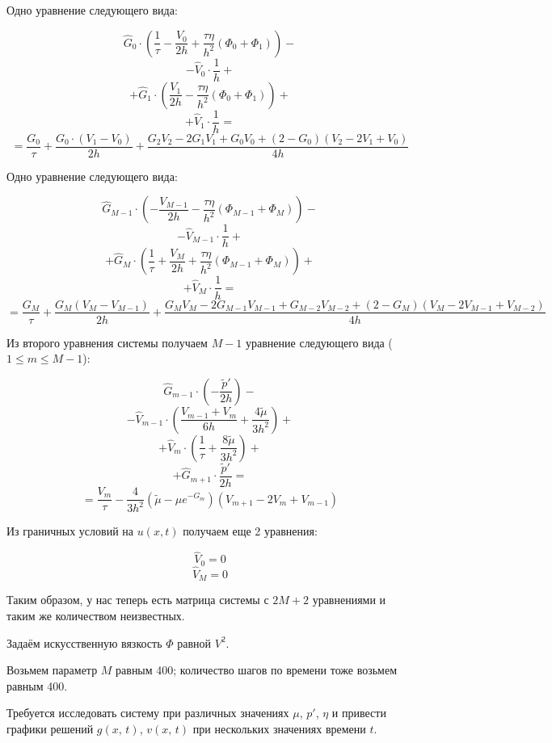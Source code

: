 \documentclass[12pt]{article}
\begin{document}
Одно уравнение следующего вида:

$$
  \hat{G}_0 \cdot \left( \frac{1}{\tau} - \frac{V_0}{2h} + \frac{\tau\eta}{h^2}\left(\Phi_{0} + \Phi_{1}\right)\right)
-
$$
$$
- \hat{V}_0 \cdot \frac{1}{h}
+
$$
$$
+ \hat{G}_1 \cdot \left(\frac{V_1}{2h} - \frac{\tau\eta}{h^2}\left(\Phi_{0} + \Phi_{1}\right)\right)
+
$$
$$
+ \hat{V}_1 \cdot \frac{1}{h} 
= 
$$
$$ 
= \frac{G_0}{\tau} +
  \frac{G_0 \cdot \left( V_1 - V_0 \right)}{2h} +
  \frac{G_2 V_2 - 2 G_1 V_1 + G_0 V_0 +
      \left( 2 - G_0 \right) \left( V_2 - 2 V_1 + V_0 \right)}{4h}
$$

Одно уравнение следующего вида:

$$
\hat{G}_{M-1} \cdot \left(-\frac{V_{M-1}}{2h} - \frac{\tau\eta}{h^2}\left(\Phi_{M-1} + \Phi_{M}\right)\right)
-
$$
$$
- \hat{V}_{M-1} \cdot \frac{1}{h}
+
$$
$$
+ \hat{G}_{M}   \cdot \left( \frac{1}{\tau} + \frac{V_M}{2h} + \frac{\tau\eta}{h^2}\left(\Phi_{M-1} + \Phi_{M}\right)\right)
+
$$
$$
+ \hat{V}_{M}   \cdot \frac{1}{h} 
= 
$$
$$
= \frac{G_M}{\tau} +
  \frac{G_M \left( V_M - V_{M-1} \right) }{2h} +
  \frac{G_M V_M - 2 G_{M-1} V_{M-1} + G_{M-2} V_{M-2} +
      \left( 2 - G_M \right) \left( V_M - 2 V_{M-1} + V_{M-2} \right) }{4h}
$$

Из второго уравнения системы получаем $M - 1$ уравнение следующего вида ($1 \leq m \leq M - 1$):

$$
\hat{G}_{m-1} \cdot \left (-\frac{\tilde{p}'}{2h}\right)
-
$$
$$
- \hat{V}_{m-1} \cdot \left( \frac{V_{m-1} + V_m}{6h} + \frac{4\tilde\mu}{3h^2} \right)
+
$$
$$
+ \hat{V}_{m}   \cdot \left( \frac{1}{\tau} + \frac{8\tilde\mu}{3h^2}  \right)
+
$$
$$
+ \hat{G}_{m+1} \cdot \frac{\tilde{p}'}{2h} =
$$
$$
= \frac{V_m}{\tau} 
- \frac{4}{3h^2}\left(\tilde\mu - \mu e^{-G_m}\right)\left(V_{m+1} - 2V_{m} + V_{m-1}\right)
$$

Из граничных условий на $u(x, t)$ получаем еще 2 уравнения:

$$
\hat{V}_{0} = 0
$$
$$
\hat{V}_{M} = 0
$$

Таким образом, у нас теперь есть матрица системы с $2M + 2$ уравнениями и таким же количеством неизвестных.

Задаём искусственную вязкость $\Phi$ равной $V^2$.

Возьмем параметр $M$ равным 400; количество шагов по времени тоже возьмем равным 400.

Требуется исследовать систему при различных значениях $\mu$, $p'$, $\eta$ и привести графики решений $g(x{,}\, t)$, $v(x{,}\, t)$ при нескольких значениях времени $t$.
\end{document}
